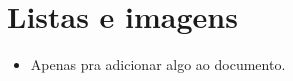 \chapter{Listas e imagens}

\begin{itemize}
	\item Apenas pra adicionar algo ao documento.
\end{itemize}


\newpage
